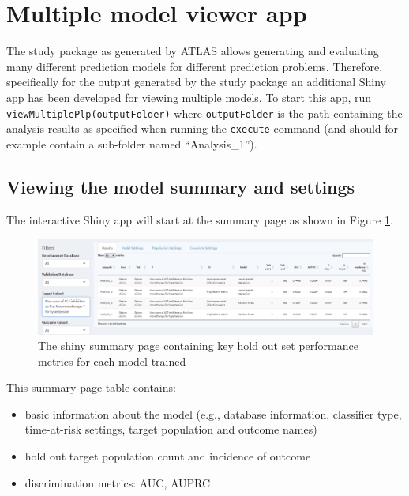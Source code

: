 \documentclass[11pt]{book}
\providecommand{\tightlist}{%
  \setlength{\itemsep}{0pt}\setlength{\parskip}{0pt}}
\theoremstyle{definition}
\theoremstyle{definition}
\theoremstyle{definition}
\theoremstyle{remark}
\begin{document}
\hypertarget{multiple-model-viewer-app}{%
\section{Multiple model viewer app}\label{multiple-model-viewer-app}}

The study package as generated by ATLAS allows generating and evaluating many different prediction models for different prediction problems. Therefore, specifically for the output generated by the study package an additional Shiny app has been developed for viewing multiple models. To start this app, run \texttt{viewMultiplePlp(outputFolder)} where \texttt{outputFolder} is the path containing the analysis results as specified when running the \texttt{execute} command (and should for example contain a sub-folder named ``Analysis\_1'').

\hypertarget{viewing-the-model-summary-and-settings}{%
\subsection{Viewing the model summary and settings}\label{viewing-the-model-summary-and-settings}}

The interactive Shiny app will start at the summary page as shown in Figure \ref{fig:multiShinySummary}.

\begin{figure}

{\centering \includegraphics[width=1\linewidth]{images/PatientLevelPrediction/shiny/shinyFilter} 

}

\caption{The shiny summary page containing key hold out set performance metrics for each model trained}\label{fig:multiShinySummary}
\end{figure}

This summary page table contains:

\begin{itemize}
\tightlist
\item
  basic information about the model (e.g., database information, classifier type, time-at-risk settings, target population and outcome names)
\item
  hold out target population count and incidence of outcome
\item
  discrimination metrics: AUC, AUPRC
\end{itemize}
\end{document}
